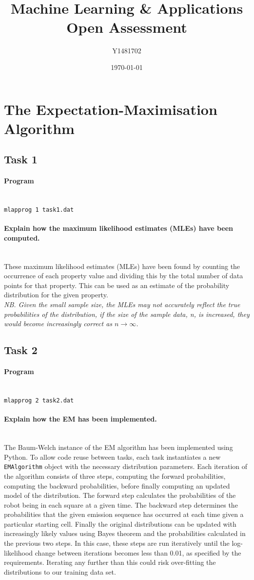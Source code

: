 \documentclass{article}
\title{Machine Learning \& Applications\\Open Assessment}
\author{Y1481702}
\date{\today}
\newcommand{\myparagraph}[1]{\paragraph{#1}\mbox{}\\}
\begin{document}
 
\begin{titlepage}
\maketitle
\tableofcontents
\end{titlepage}
 
\section{The Expectation-Maximisation Algorithm}
\subsection{Task 1}
\myparagraph{Program } %
\texttt{mlap\textunderscore prog 1 task1.dat}


\myparagraph{Explain how the maximum likelihood estimates (MLEs) have been computed.} %
These maximum likelihood estimates (MLEs) have been found by counting the occurrence of each property value and dividing this by the total number of data points for that property. This can be used as an estimate of the probability distribution for the given property.\\

\textit{NB. Given the small sample size, the MLEs may not accurately reflect the true probabilities of the distribution, if the size of the sample data, n, is increased, they would become increasingly correct as $n \to \infty$.}

\subsection{Task 2}
\myparagraph{Program} %
\texttt{mlap\textunderscore prog 2 task2.dat}

\myparagraph{Explain how the EM has been implemented.}
The Baum-Welch instance of the EM algorithm has been implemented using Python. To allow code reuse between tasks, each task instantiates a new \texttt{EMAlgorithm} object with the necessary distribution parameters. Each iteration of the algorithm consists of three steps, computing the forward probabilities, computing the backward probabilities, before finally computing an updated model of the distribution. The forward step calculates the probabilities of the robot being in each square at a given time. The backward step determines the probabilities that the given emission sequence has occurred at each time given a particular starting cell. Finally the original distributions can be updated with increasingly likely values using Bayes theorem and the probabilities calculated in the previous two steps. In this case, these steps are run iteratively until the log-likelihood change between iterations becomes less than 0.01, as specified by the requirements. Iterating any further than this could risk over-fitting the distributions to our training data set.
\end{document}
